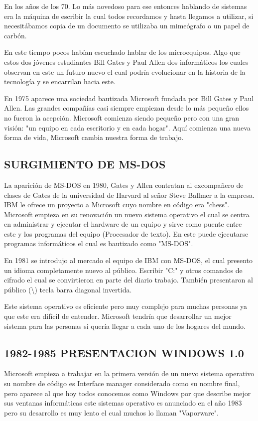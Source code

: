 En los años de los 70. Lo más novedoso para ese entonces hablando de sistemas era la máquina de escribir la cual todos recordamos y hasta llegamos a utilizar, si 
necesitábamos copia de un documento se utilizaba un mimeógrafo o un papel de carbón.

En este tiempo pocos habían escuchado hablar de los microequipos. Algo que estos dos jóvenes estudiantes Bill Gates y Paul Allen dos informáticos los cuales observan en 
este un futuro nuevo el cual podría evolucionar en la historia de la tecnología y se encarrilan hacia este.

En 1975 aparece una sociedad bautizada Microsoft fundada por  Bill Gates y Paul Allen. Las grandes compañías casi siempre empiezan desde lo más pequeño ellos no fueron la 
acepción. Microsoft comienza siendo pequeño pero con una gran visión: "un equipo en cada escritorio y en cada hogar". Aquí comienza una nueva forma de vida, Microsoft 
cambia nuestra forma de trabajo.

\subsection*{SURGIMIENTO DE MS-DOS}
La aparición de MS-DOS en 1980, Gates y Allen contratan al excompañero de clases de Gates de la universidad de Harvard al señor Steve Ballmer a la empresa. IBM le ofrece 
un proyecto a Microsoft cuyo nombre en código era "chess". Microsoft empieza en su renovación un nuevo sistema operativo el cual se centra en administrar y ejecutar el 
hardware de un equipo y sirve como puente entre este y los programas del equipo (Procesador de texto). En este puede ejecutarse programas informáticos el cual es bautizado 
como "MS-DOS".
 
En 1981 se introdujo al mercado el equipo de IBM con MS-DOS, el cual presento un idioma completamente nuevo al público. Escribir "C:" y otros comandos de cifrado el cual se 
convirtieron en parte del diario trabajo. También presentaron al público (\textbackslash) tecla barra diagonal invertida.
 
Este sistema operativo es eficiente pero muy complejo para muchas personas ya que este era difícil de entender. Microsoft tendría que desarrollar un mejor sistema para las 
personas si quería llegar a cada uno de los hogares del mundo.

\subsection*{1982-1985 PRESENTACION WINDOWS 1.0}
Microsoft empieza a trabajar en la primera versión de un nuevo sistema operativo su nombre de código es Interface manager considerado como su nombre final, pero aparece al 
que hoy todos conocemos como Windows por que describe mejor sus ventanas informáticas este sistemas operativo es anunciado en el año 1983 pero su desarrollo es muy lento el 
cual muchos lo llaman "Vaporware".
 
